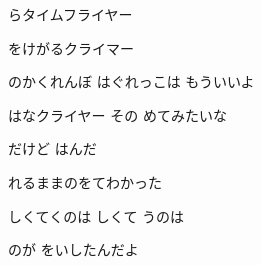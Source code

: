 \documentclass[14pt]{ltjsarticle}
\begin{document}
{\item
  らタイムフライヤー
  \jisho{}

  をけがるクライマー
  \jisho{}

  のかくれんぼ はぐれっこは もういいよ
  \jisho{}

\item
  はなクライヤー その めてみたいな
  \jisho{}

  だけど はんだ
  \jisho{}

  れるままのをてわかった
  \jisho{}

\item
  しくてくのは しくて うのは
  \jisho{}

  のが をいしたんだよ
  \jisho{}
}
\end{document}

